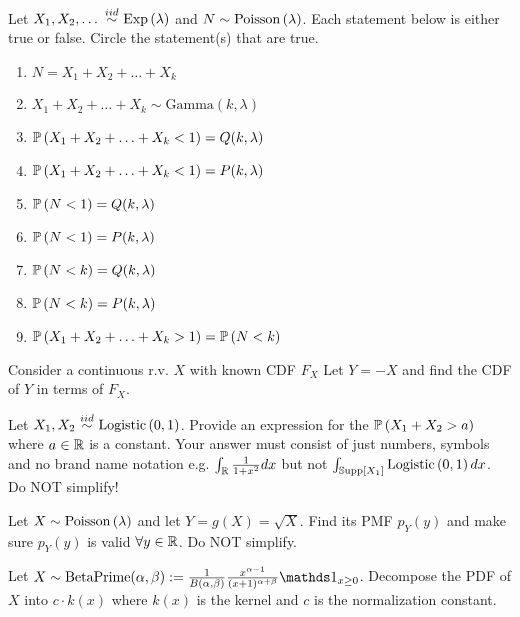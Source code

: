 \documentclass[12pt]{article}
\begin{document}
 Let $X_1, X_2, \ldots \iid \exponential{\lambda}$ and $N \sim \mathrm{Poisson}\left(\lambda\right)$. Each statement below is either true or false. Circle the statement(s) that are true.

\begin{enumerate}
\item $N = X_1 + X_2 + \ldots + X_k$
\item $X_1 + X_2 + \ldots + X_k \sim \text{Gamma}(k, \lambda)$
\item $\mathbb{P}\left(X_1 + X_2 + \ldots + X_k < 1\right) = Q(k, \lambda)$
\item $\mathbb{P}\left(X_1 + X_2 + \ldots + X_k < 1\right) = P(k, \lambda)$
\item $\mathbb{P}\left(N < 1\right) = Q(k, \lambda)$
\item $\mathbb{P}\left(N < 1\right) = P(k, \lambda)$
\item $\mathbb{P}\left(N < k\right) = Q(k, \lambda)$
\item $\mathbb{P}\left(N < k\right) = P(k, \lambda)$
\item $\mathbb{P}\left(X_1 + X_2 + \ldots + X_k > 1\right) = \mathbb{P}\left(N < k\right)$
\end{enumerate}




 Consider a continuous r.v. $X$ with known CDF $F_X$ Let $Y = -X$ and find the CDF of $Y$ in terms of $F_X$.  

 Let $X_1, X_2 \iid \text{Logistic}\parens{0, 1}$. Provide an expression for the $\mathbb{P}\left(X_1 + X_2 > a\right)$ where $a \in \mathbb{R}$ is a constant. Your answer must consist of just numbers, symbols and no brand name notation e.g. $\int_{\mathbb{R}} \frac{1}{1 + x^2} dx$ but not  $\int_{\mathbb{S}\text{upp}\left[X_1\right]} \text{Logistic}\left(0, 1\right) dx$. Do NOT simplify! 




 Let $X \sim \mathrm{Poisson}\left(\lambda\right)$ and let $Y = g(X) = \sqrt{X}$. Find its PMF $p_Y(y)$ and make sure $p_Y(y)$ is valid $\forall y \in \mathbb{R}$. Do NOT simplify. 

 Let $X \sim \text{BetaPrime}(\alpha, \beta) := \oneover{B(\alpha, \beta)} \frac{x^{\alpha - 1}}{(x + 1)^{\alpha + \beta}} \indic{x \geq 0}$. Decompose the PDF of $X$ into $c \cdot k(x)$ where $k(x)$ is the kernel and $c$ is the normalization constant. 
%
\end{document}
